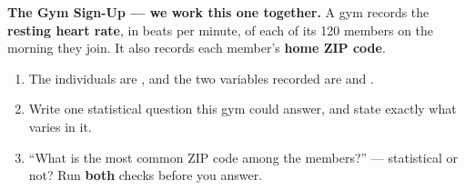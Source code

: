 \documentclass[10pt]{article}
\begin{document}
\boxguard[20]
\begin{practicebox}
\small
\textbf{The Gym Sign-Up --- we work this one together.} A gym records the \textbf{resting heart
rate}, in beats per minute, of each of its 120 members on the morning they join. It also records
each member's \textbf{home ZIP code}.

\begin{enumerate}[label=\textbf{\alph*.}, leftmargin=1.8em, itemsep=7pt]
  \item The individuals are , and the two variables recorded are
         and .
  \item Write one statistical question this gym could answer, and state exactly what varies
        in it.\\[3pt]
  \item ``What is the most common ZIP code among the members?'' --- statistical or not? Run
        \textbf{both} checks before you answer.\\[3pt]
\end{enumerate}
\end{practicebox}

\vspace{0.10in}
\end{document}
